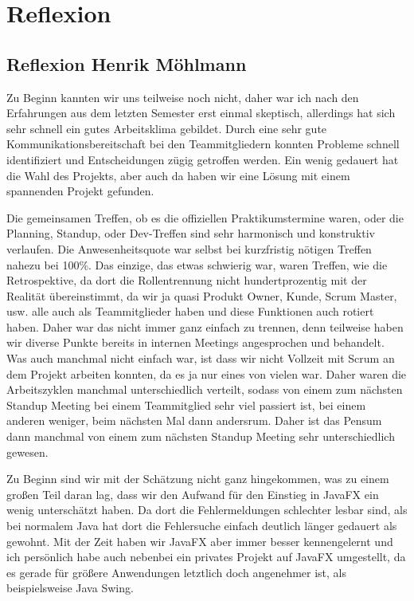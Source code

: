 \chapter{Reflexion}

\section{Reflexion Henrik Möhlmann}

Zu Beginn kannten wir uns teilweise noch nicht, daher war ich nach den Erfahrungen aus dem letzten Semester erst einmal skeptisch, allerdings hat sich sehr schnell ein gutes Arbeitsklima gebildet. Durch eine sehr gute Kommunikationsbereitschaft bei den Teammitgliedern konnten Probleme schnell identifiziert und Entscheidungen zügig getroffen werden. Ein wenig gedauert hat die Wahl des Projekts, aber auch da haben wir eine Lösung mit einem spannenden Projekt gefunden. 

Die gemeinsamen Treffen, ob es die offiziellen Praktikumstermine waren, oder die Planning, Standup, oder Dev-Treffen sind sehr harmonisch und konstruktiv verlaufen. Die Anwesenheitsquote war selbst bei kurzfristig nötigen Treffen nahezu bei 100\%. Das einzige, das etwas schwierig war, waren Treffen, wie die Retrospektive, da dort die Rollentrennung nicht hundertprozentig mit der Realität übereinstimmt, da wir ja quasi Produkt Owner, Kunde, Scrum Master, usw. alle auch als Teammitglieder haben und diese Funktionen auch rotiert haben. Daher war das nicht immer ganz einfach zu trennen, denn teilweise haben wir diverse Punkte bereits in internen Meetings angesprochen und behandelt. Was auch manchmal nicht einfach war, ist dass wir nicht Vollzeit mit Scrum an dem Projekt arbeiten konnten, da es ja nur eines von vielen war. Daher waren die Arbeitszyklen manchmal unterschiedlich verteilt, sodass von einem zum nächsten Standup Meeting bei einem Teammitglied sehr viel passiert ist, bei einem anderen weniger, beim nächsten Mal dann andersrum.  Daher ist das Pensum dann manchmal von einem zum nächsten Standup Meeting sehr unterschiedlich gewesen. 

Zu Beginn sind wir mit der Schätzung nicht ganz hingekommen, was zu einem großen Teil daran lag, dass wir den Aufwand für den Einstieg in JavaFX ein wenig unterschätzt haben. Da dort die Fehlermeldungen schlechter lesbar sind, als bei \glqq normalem Java\glqq{} hat dort die Fehlersuche einfach deutlich länger gedauert als gewohnt. Mit der Zeit haben wir JavaFX aber immer besser kennengelernt und ich persönlich habe auch nebenbei ein privates Projekt auf JavaFX umgestellt, da es gerade für größere Anwendungen letztlich doch angenehmer ist, als beispielsweise Java Swing. 

